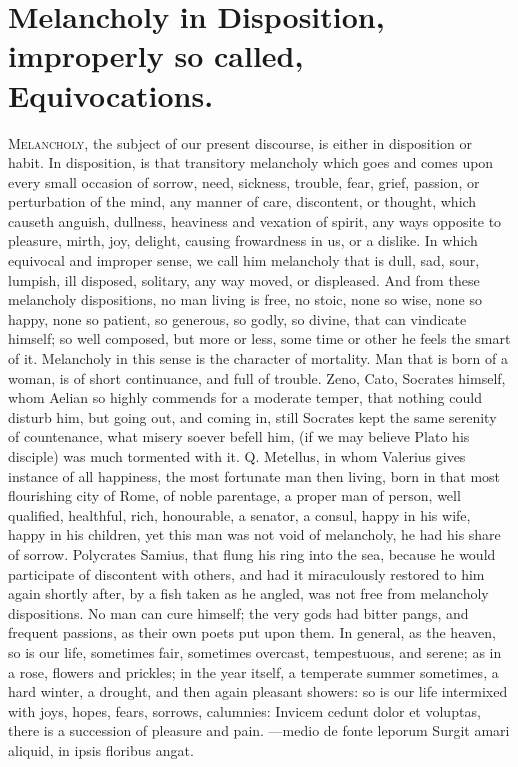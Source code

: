 {\section[Melancholic Disposition]{Melancholy in Disposition, improperly so called, Equivocations.}
\lettrine{M}{elancholy}, the subject of our present discourse, is either in
disposition or habit. In disposition, is that transitory melancholy
which goes and comes upon every small occasion of sorrow, need,
sickness, trouble, fear, grief, passion, or perturbation of the mind,
any manner of care, discontent, or thought, which causeth anguish,
dullness, heaviness and vexation of spirit, any ways opposite to
pleasure, mirth, joy, delight, causing frowardness in us, or a dislike.
In which equivocal and improper sense, we call him melancholy that is
dull, sad, sour, lumpish, ill disposed, solitary, any way moved, or
displeased. And from these melancholy dispositions, no man living
is free, no stoic, none so wise, none so happy, none so patient, so
generous, so godly, so divine, that can vindicate himself; so well
composed, but more or less, some time or other he feels the smart of
it. Melancholy in this sense is the character of mortality. Man
that is born of a woman, is of short continuance, and full of trouble.
Zeno, Cato, Socrates himself, whom Aelian so highly commends for a
moderate temper, that nothing could disturb him, but going out, and
coming in, still Socrates kept the same serenity of countenance, what
misery soever befell him, (if we may believe Plato his disciple) was
much tormented with it. Q. Metellus, in whom Valerius gives
instance of all happiness, the most fortunate man then living, born in
that most flourishing city of Rome, of noble parentage, a proper man of
person, well qualified, healthful, rich, honourable, a senator, a
consul, happy in his wife, happy in his children, \etc{} yet this man was
not void of melancholy, he had his share of sorrow. Polycrates
Samius, that flung his ring into the sea, because he would participate
of discontent with others, and had it miraculously restored to him
again shortly after, by a fish taken as he angled, was not free from
melancholy dispositions. No man can cure himself; the very gods had
bitter pangs, and frequent passions, as their own poets put upon
them. In general, as the heaven, so is our life, sometimes fair,
sometimes overcast, tempestuous, and serene; as in a rose, flowers and
prickles; in the year itself, a temperate summer sometimes, a hard
winter, a drought, and then again pleasant showers: so is our life
intermixed with joys, hopes, fears, sorrows, calumnies: Invicem cedunt
dolor et voluptas, there is a succession of pleasure and pain.
---medio de fonte leporum
Surgit amari aliquid, in ipsis floribus angat.

}
